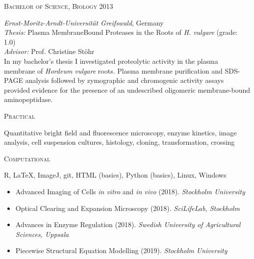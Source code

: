 \documentclass[11pt]{article}
\begin{document}
\textsc{\large{Bachelor of Science, Biology} \hfill \textsc{2013}}
\begin{addmargin}[24pt]{0pt}
	\textit{Ernst-Moritz-Arndt-Universität Greifswald}, Germany \\
	\textit{Thesis:} Plasma Membrane\textendash Bound Proteases in the Roots of \textit{H. vulgare} (grade: \textsc{1.0}) \\
	\textit{Advisor:} Prof. Christine Stöhr
	\vspace{0.1cm} \\
	\small{In my bachelor's thesis I investigated proteolytic activity in the plasma membrane of \textit{Hordeum vulgare} roots. Plasma membrane purification and SDS-PAGE analysis followed by zymographic and chromogenic activity assays provided evidence for the presence of an undescribed oligomeric membrane-bound aminopeptidase.}
\end{addmargin}
\vspace{0.5cm}


\textsc{\large{Practical}} 
\begin{addmargin}[24pt]{0pt}
	Quantitative bright field and fluorescence microscopy, enzyme kinetics, image analysis, cell suspension cultures, histology, cloning, transformation, crossing
\end{addmargin}
\vspace{0.2cm}

\textsc{\large{Computational}} 
\begin{addmargin}[24pt]{0pt}
	R, LaTeX, ImageJ, git, HTML (basics), Python (basics), Linux, Windows
\end{addmargin}	
\vspace{0.5cm}

\vspace{-0.175cm}
\begin{itemize}[label={},itemindent=-9pt,leftmargin=24pt]
	\itemsep-0.1cm
	\item Advanced Imaging of Cells \textit{in vitro} and \textit{in vivo} (2018). \textit{Stockholm University} 
	\item Optical Clearing and Expansion Microscopy (2018). \textit{SciLifeLab, Stockholm} 	
	\item Advances in Enzyme Regulation (2018). \textit{Swedish University of Agricultural Sciences, Uppsala} 
	\item Piecewise Structural Equation Modelling (2019). \textit{Stockholm University}
\end{itemize}
\vspace{0.3cm}
\end{document}
